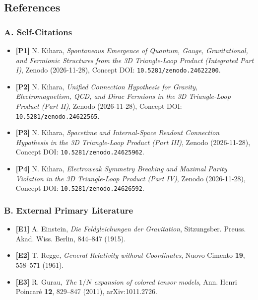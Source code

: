 \documentclass[
  a4paper,
]{article}
\providecommand{\tightlist}{%
  \setlength{\itemsep}{0pt}\setlength{\parskip}{0pt}}
\begin{document}
\subsection{References}\label{references}

\subsubsection{A. Self-Citations}\label{a.-self-citations}

\begin{itemize}
\tightlist
\item
  \textbf{{[}P1{]}} N. Kihara, \emph{Spontaneous Emergence of Quantum,
  Gauge, Gravitational, and Fermionic Structures from the 3D
  Triangle-Loop Product (Integrated Part I)}, Zenodo (2026-11-28),
  Concept DOI: \texttt{10.5281/zenodo.24622200}.
\item
  \textbf{{[}P2{]}} N. Kihara, \emph{Unified Connection Hypothesis for
  Gravity, Electromagnetism, QCD, and Dirac Fermions in the 3D
  Triangle-Loop Product (Part II)}, Zenodo (2026-11-28), Concept DOI:
  \texttt{10.5281/zenodo.24622565}.
\item
  \textbf{{[}P3{]}} N. Kihara, \emph{Spacetime and Internal-Space
  Readout Connection Hypothesis in the 3D Triangle-Loop Product (Part
  III)}, Zenodo (2026-11-28), Concept DOI:
  \texttt{10.5281/zenodo.24625962}.
\item
  \textbf{{[}P4{]}} N. Kihara, \emph{Electroweak Symmetry Breaking and
  Maximal Parity Violation in the 3D Triangle-Loop Product (Part IV)},
  Zenodo (2026-11-28), Concept DOI: \texttt{10.5281/zenodo.24626592}.
\end{itemize}

\subsubsection{B. External Primary
Literature}\label{b.-external-primary-literature}

\begin{itemize}
\tightlist
\item
  \textbf{{[}E1{]}} A. Einstein, \emph{Die Feldgleichungen der
  Gravitation}, Sitzungsber. Preuss. Akad. Wiss. Berlin, 844--847
  (1915).
\item
  \textbf{{[}E2{]}} T. Regge, \emph{General Relativity without
  Coordinates}, Nuovo Cimento \textbf{19}, 558--571 (1961).
\item
  \textbf{{[}E3{]}} R. Gurau, \emph{The \(1/N\) expansion of colored
  tensor models}, Ann. Henri Poincaré \textbf{12}, 829--847 (2011),
  arXiv:1011.2726.
\end{itemize}
\end{document}
